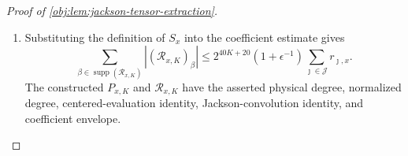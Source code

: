 \begin{proof}[Proof of \cref{obj:lem:jackson-tensor-extraction}]
\begin{enumerate}
\[\begin{aligned}
\prod_{\jmath\in\mathcal J}J_K(\tau_\jmath)\,d\tau .
\end{aligned}
\]
Thus
\[
P_{x,K}(b_x+r_x\odot\cos\vartheta)
=
\int_{[-\pi,\pi]^{\mathcal J}}
\bar f_\epsilon(b_x+r_x\odot\cos(\vartheta-\tau))
\prod_{\jmath\in\mathcal J}J_K(\tau_\jmath)\,d\tau.
\]
For each coordinate, \(J_K(-t)=J_K(t)\): both sine factors in its defining ratio change sign, and the ratio is raised to the fourth power. The coordinatewise substitution \(t=-\tau\) preserves \([-\pi,\pi]^{\mathcal J}\) and Lebesgue measure, and therefore changes \(\cos(\vartheta-\tau)\) to \(\cos(\vartheta+t)\) while leaving the product kernel unchanged. The last display is consequently the order-\(K\) tensor Jackson convolution in \cref{obj:def:jackson-kernel} of \(\bar f_\epsilon\) precomposed with the affine parametrization of \(Q_x\), evaluated at \(\vartheta\).

\item Substituting the definition of \(S_x\) into the coefficient estimate gives
\[
\sum_{\beta\in\operatorname{supp}(\mathcal R_{x,K})}
|(\mathcal R_{x,K})_\beta|
\le
2^{40K+20}
(1+\epsilon^{-1})
\sum_{\jmath\in\mathcal J}r_{\jmath,x}.
\]
The constructed \(P_{x,K}\) and \(\mathcal R_{x,K}\) have the asserted physical degree, normalized degree, centered-evaluation identity, Jackson-convolution identity, and coefficient envelope.
\end{enumerate}
\end{proof}
